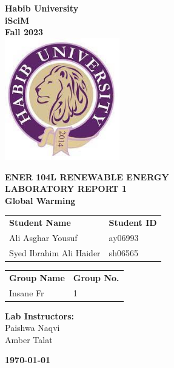 \documentclass[a4paper, 12pt, english]{article}
\begin{document}
\begin{titlepage}
	\begin{center}
		\textbf{\LARGE Habib University}\\[0.5cm]
		\textbf{\large iSciM}\\[0.2cm]
		\textbf {\large Fall 2023}\\[0.2cm]
		\vspace{20pt}
		\includegraphics[width=5cm]{images/habiblogo.jpg}\\[1cm]
		\par
		\vspace{20pt}
		\textbf{\Large ENER 104L RENEWABLE ENERGY}\\
		\vspace{15pt}
		\myrule[1pt][7pt]
		\textbf{\LARGE  LABORATORY REPORT 1}\\
		\vspace{15pt}
		\textbf{\large Global Warming}\\
		\myrule[1pt][7pt]
		\vspace{25pt}
		\begin{tabular}{@{}p{5cm}p{3cm}@{}}
			\textbf{\large Student Name} & \textbf{\large Student ID} \\
			Ali Asghar Yousuf            & ay06993                    \\ %
			Syed Ibrahim Ali Haider      & sh06565                    \\ %
		\end{tabular}

		\vspace{10pt}
		\begin{tabular}{@{}p{5cm}p{3cm}@{}}
			\textbf{\large Group Name} & \textbf{\large Group No.} \\
			Insane Fr                  & 1                         \\
		\end{tabular}

		\vspace{45pt}
		\textbf {\large Lab Instructors:}\\[0.2cm]
		\Large {Paishwa Naqvi}\\[0.1cm]
		\Large {Amber Talat}\\[0.1cm]
	\end{center}

	\par
	\vfill
	\begin{center}
		\textbf{\today}\\
	\end{center}

\end{titlepage}
\end{document}
